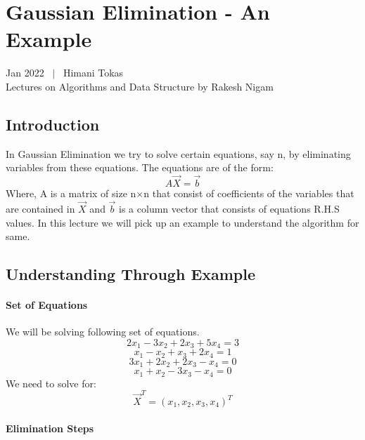 \documentclass[12pt, oneside,table]{report}
\newcommand{\?}{\stackrel{?}{=}}
\theoremstyle{definition}
\begin{document}
\chapter{Gaussian Elimination - An Example} %
%
Jan 2022 \ $|$ \ Himani Tokas  \\
Lectures on Algorithms and Data Structure by Rakesh Nigam\\ 
\section{Introduction}
In Gaussian Elimination we try to solve certain equations, say n, by eliminating variables from these equations. The equations are of the form:
\begin{equation}
    A\overrightarrow{X} = \overrightarrow{b}
\end{equation}
Where, A is a matrix of size n$\times$n that consist of coefficients of the variables that are contained in $\overrightarrow{X}$ and $\overrightarrow{b}$ is a column vector that consists of equations R.H.S values. In this lecture we will pick up an example to understand the algorithm for same.
\section{Understanding Through Example}
\subsubsection{Set of Equations}
We will be solving following set of equations.
\begin{equation}
    2x_{1}-3x_{2}+2x_{3}+5x_{4}=3
\end{equation}
\begin{equation}
    x_{1}-x_{2}+x_{3}+2x_{4}=1
\end{equation}
\begin{equation}
    3x_{1}+2x_{2}+2x_{3}-x_{4}=0
\end{equation}
\begin{equation}
    x_{1}+x_{2}-3x_{3}-x_{4}=0
\end{equation}
We need to solve for:
\begin{equation}
    \overrightarrow{X}^{T} = (x_{1},x_{2},x_{3},x_{4})^{T}
\end{equation}
\subsubsection{Elimination Steps}
\end{document}

